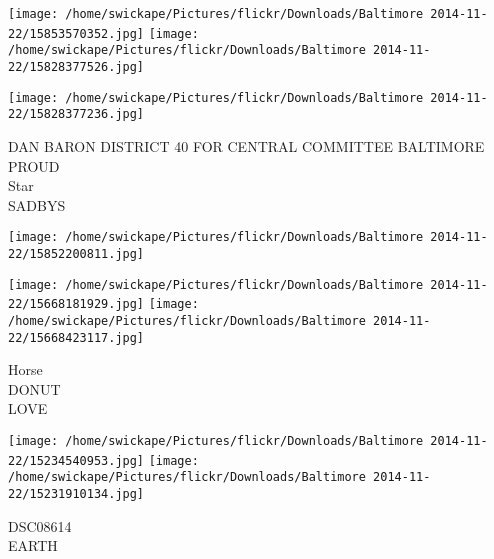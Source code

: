 \documentclass[10pt,letterpaper]{article}
\begin{document}
\texttt{[image: /home/swickape/Pictures/flickr/Downloads/Baltimore 2014-11-22/15853570352.jpg]}
\texttt{[image: /home/swickape/Pictures/flickr/Downloads/Baltimore 2014-11-22/15828377526.jpg]}

\texttt{[image: /home/swickape/Pictures/flickr/Downloads/Baltimore 2014-11-22/15828377236.jpg]}

DAN BARON DISTRICT 40 FOR CENTRAL COMMITTEE BALTIMORE PROUD\\
Star\\
SADBYS
\pagebreak

\texttt{[image: /home/swickape/Pictures/flickr/Downloads/Baltimore 2014-11-22/15852200811.jpg]}

\vspace{0.25in}
\texttt{[image: /home/swickape/Pictures/flickr/Downloads/Baltimore 2014-11-22/15668181929.jpg]}
\texttt{[image: /home/swickape/Pictures/flickr/Downloads/Baltimore 2014-11-22/15668423117.jpg]}

Horse\\
DONUT\\
LOVE
\pagebreak

\texttt{[image: /home/swickape/Pictures/flickr/Downloads/Baltimore 2014-11-22/15234540953.jpg]}
\texttt{[image: /home/swickape/Pictures/flickr/Downloads/Baltimore 2014-11-22/15231910134.jpg]}

DSC08614\\
EARTH
\pagebreak
\end{document}
